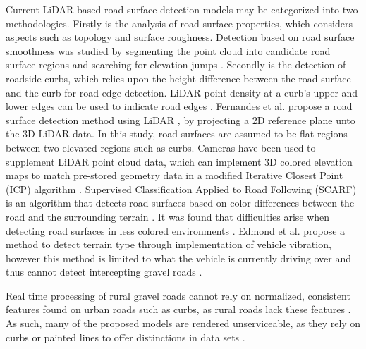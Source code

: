\documentclass[balance,upint,subscriptcorrection,varvw,mathalfa=cal=boondoxo,colorlinks]{asmeconf}
\begin{document}
	{Current LiDAR based road surface detection models may be categorized into two methodologies. Firstly is the analysis of road surface properties, which considers aspects such as topology and surface roughness. Detection based on road surface smoothness was studied by segmenting the point cloud into candidate road surface regions and searching for elevation jumps \cite{liu_new_2013}. Secondly is the detection of roadside curbs, which relies upon the height difference between the road surface and the curb for road edge detection. LiDAR point density at a curb's upper and lower edges can be used to indicate road edges \cite{ibrahim_curb-based_2012}. Fernandes et al. propose a road surface detection method using LiDAR \cite{fernandes_road_2014}, by projecting a 2D reference plane unto the 3D LiDAR data. In this study, road surfaces are assumed to be flat regions between two elevated regions such as curbs. Cameras have been used to supplement LiDAR point cloud data, which can implement 3D colored elevation maps to match pre-stored geometry data in a modified Iterative Closest Point (ICP) algorithm \cite{manz_detection_2011}. Supervised Classification Applied to Road Following (SCARF) is an algorithm that detects road surfaces based on color differences between the road and the surrounding terrain \cite{crisman_scarf_1993}. It was found that difficulties arise when detecting road surfaces in less colored environments \cite{crisman_scarf_1993,manz_detection_2011}. Edmond et al. propose a method to detect terrain type through implementation of vehicle vibration, however this method is limited to what the vehicle is currently driving over and thus cannot detect intercepting gravel roads \cite{dupont_online_2008}.}
	
	{Real time processing of rural gravel roads cannot rely on normalized, consistent features found on urban roads such as curbs, as rural roads lack these features \cite{skorseth_gravel_nodate}. As such, many of the proposed models are rendered unserviceable, as they rely on curbs or painted lines to offer distinctions in data sets \cite{yadav_extraction_2017,liu_new_2013,qiu_fast_2016,fernandes_road_2014,seker_experiments_nodate,yang_semi-automated_2013,miyazaki_line-based_2014,hervieu_road_2013,smadja_road_nodate}.}
	
\end{document}
